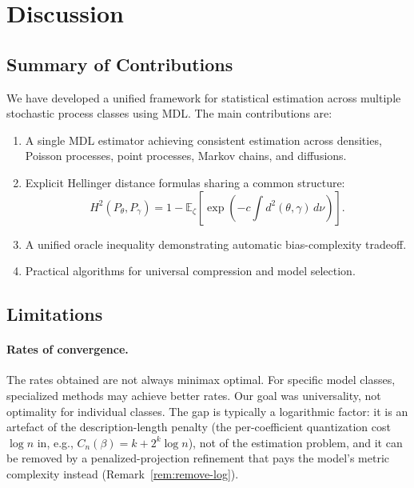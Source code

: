 \documentclass[preprint,review,12pt]{article}
\begin{document}
\section{Discussion}
\label{sec:discussion}

\subsection{Summary of Contributions}

We have developed a unified framework for statistical estimation across 
multiple stochastic process classes using MDL. The main contributions are:

\begin{enumerate}[label=(\roman*)]
\item A single MDL estimator achieving consistent estimation across 
densities, Poisson processes, point processes, Markov chains, and diffusions.

\item Explicit Hellinger distance formulas sharing a common structure:
\[
H^2(P_\theta, P_\gamma) = 1 - \mathbb{E}_\zeta\left[ 
\exp\left( -c \int d^2(\theta, \gamma) \, d\nu \right) \right].
\]

\item A unified oracle inequality demonstrating automatic bias-complexity 
tradeoff.

\item Practical algorithms for universal compression and model selection.
\end{enumerate}

\subsection{Limitations}

\paragraph{Rates of convergence.}
The rates obtained are not always minimax optimal. For specific model classes,
specialized methods may achieve better rates. Our goal was universality, not
optimality for individual classes. The gap is typically a logarithmic factor: it
is an artefact of the description-length penalty (the per-coefficient quantization
cost $\log n$ in, e.g., $C_n(\beta)=k+2^k\log n$), not of the estimation problem,
and it can be removed by a penalized-projection refinement that pays the model's
metric complexity instead (Remark~\ref{rem:remove-log}).
\end{document}
